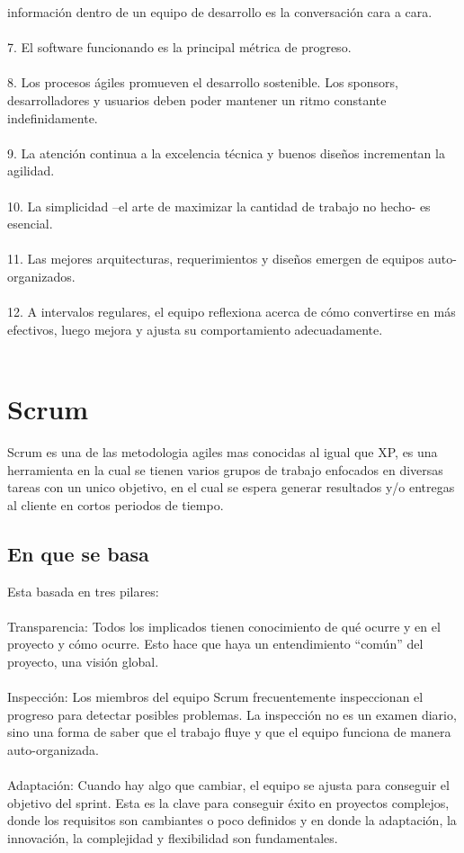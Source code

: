 información       dentro   de   un   equipo    de   desarrollo    es   la 
conversación cara a cara.\\
\\
7.  El   software      funcionando      es   la   principal    métrica    de 
progreso.\\
\\
8.  Los procesos ágiles promueven el desarrollo sostenible. 
Los     sponsors,    desarrolladores      y  usuarios    deben    poder 
mantener un ritmo constante indefinidamente. \\
\\
9.  La   atención   continua   a   la   excelencia   técnica   y   buenos 
diseños incrementan la agilidad.\\
\\
10.  La   simplicidad    –el    arte  de   maximizar      la  cantidad    de 
trabajo no hecho- es esencial.\\
\\
11.  Las    mejores     arquitecturas,     requerimientos       y   diseños 
emergen de equipos auto-organizados.\\
\\
12.  A   intervalos   regulares,   el   equipo   reflexiona   acerca   de 
cómo convertirse en más efectivos, luego mejora y ajusta 
su comportamiento adecuadamente.\\
\\
\section{Scrum}
Scrum es una de las metodologia agiles mas conocidas al igual que XP, es una herramienta en la cual se tienen varios grupos de trabajo enfocados en diversas tareas con un unico objetivo, en el cual se espera generar resultados y/o entregas al cliente en cortos periodos de tiempo.
\\
\subsection{En que se basa}

Esta basada en tres pilares:
\\
\\
Transparencia: Todos los implicados tienen conocimiento de qué ocurre y en el proyecto y cómo ocurre. Esto hace que haya un entendimiento “común” del proyecto, una visión global.
\\
\\
Inspección: Los miembros del equipo Scrum frecuentemente inspeccionan el progreso para detectar posibles problemas. La inspección no es un examen diario, sino una forma de saber que el trabajo fluye y que el equipo funciona de manera auto-organizada.
\\
\\
Adaptación: Cuando hay algo que cambiar, el equipo se ajusta para conseguir el objetivo del sprint. Esta es la clave para conseguir éxito en proyectos complejos, donde los requisitos son cambiantes o poco definidos y en donde la adaptación, la innovación, la complejidad y flexibilidad son fundamentales.
